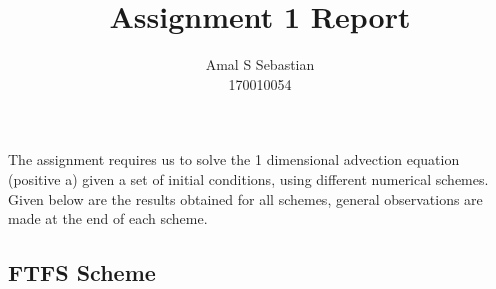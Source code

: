 \documentclass[a4paper,twoside,11pt]{article}
\begin{document}
\title{\vspace{-2\baselineskip}
Assignment 1 Report}
\author{Amal S Sebastian \\ {170010054}}

\maketitle


The assignment requires us to solve the 1 dimensional advection equation (positive a) given a set of initial conditions, using different numerical schemes. Given below are the results obtained for all schemes, general observations are made at the end of each scheme.


\subsection*{FTFS Scheme}
\end{document}
